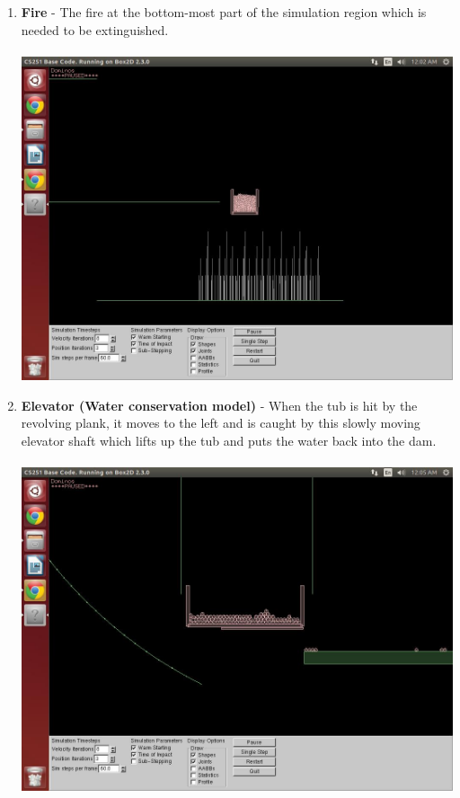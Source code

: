 \documentclass{report}
\begin{document}
\begin{enumerate}
\item \textbf{Fire} - The fire at the bottom-most part of the simulation region which is needed to be extinguished.\\\\
\includegraphics[scale=0.25]{pics/Fire}
\item \textbf{Elevator (Water conservation model)} - When the tub is hit by the revolving plank, it moves to the left and is caught by this slowly moving elevator shaft which lifts up the tub and puts the water back into the dam.\\\\
\includegraphics[scale=0.25]{pics/WaterBoxLift}
\pagebreak


\end{enumerate}
\end{document}
